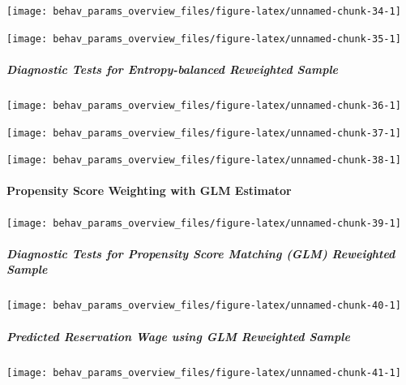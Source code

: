 \documentclass[
]{article}
\begin{document}
\begin{center}\texttt{[image: behav\_params\_overview\_files/figure-latex/unnamed-chunk-34-1]} \end{center}

\begin{center}\texttt{[image: behav\_params\_overview\_files/figure-latex/unnamed-chunk-35-1]} \end{center}

\subparagraph{Diagnostic Tests for Entropy-balanced Reweighted
Sample}\label{diagnostic-tests-for-entropy-balanced-reweighted-sample}

\begin{center}\texttt{[image: behav\_params\_overview\_files/figure-latex/unnamed-chunk-36-1]} \end{center}

\begin{center}\texttt{[image: behav\_params\_overview\_files/figure-latex/unnamed-chunk-37-1]} \end{center}

\begin{center}\texttt{[image: behav\_params\_overview\_files/figure-latex/unnamed-chunk-38-1]} \end{center}

\paragraph{Propensity Score Weighting with GLM
Estimator}\label{propensity-score-weighting-with-glm-estimator}

\begin{center}\texttt{[image: behav\_params\_overview\_files/figure-latex/unnamed-chunk-39-1]} \end{center}

\subparagraph{Diagnostic Tests for Propensity Score Matching (GLM)
Reweighted
Sample}\label{diagnostic-tests-for-propensity-score-matching-glm-reweighted-sample}

\begin{center}\texttt{[image: behav\_params\_overview\_files/figure-latex/unnamed-chunk-40-1]} \end{center}

\subparagraph{Predicted Reservation Wage using GLM Reweighted
Sample}\label{predicted-reservation-wage-using-glm-reweighted-sample}

\begin{center}\texttt{[image: behav\_params\_overview\_files/figure-latex/unnamed-chunk-41-1]} \end{center}
\end{document}
